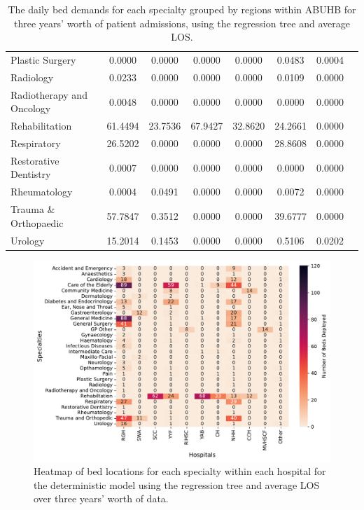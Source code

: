 \documentclass[thesis.tex]{subfiles}
\begin{document}
\begin{table}[h!]
{\begin{tabular}{lccccccc}
Plastic Surgery	&0.0000&	0.0000&	0.0000&	0.0000&	0.0483&	0.0004\\
Radiology	&0.0233&	0.0000&	0.0000&	0.0000&	0.0109&	0.0000\\
Radiotherapy and Oncology&	0.0048&	0.0000&	0.0000&	0.0000&	0.0000&	0.0000\\
Rehabilitation	&61.4494&	23.7536&	67.9427&	32.8620&	24.2661&	0.0000\\
Respiratory	&26.5202&	0.0000&	0.0000&	0.0000&	28.8608&	0.0000\\
Restorative Dentistry	&0.0007&	0.0000&	0.0000&	0.0000&	0.0000&	0.0000\\
Rheumatology	&0.0004&	0.0491&	0.0000&	0.0000&	0.0072&	0.0000\\
Trauma \& Orthopaedic&	57.7847&	0.3512&	0.0000&	0.0000&	39.6777&	0.0000\\
Urology	&15.2014&	0.1453&	0.0000&	0.0000&	0.5106&	0.0202\\                              \bottomrule
    \end{tabular}}
    \caption{The daily bed demands for each specialty grouped by regions within ABUHB for three years’ worth of patient admissions, using the regression tree and average LOS.}
    \label{apptab:LinkedDemands1}
\end{table}
\begin{figure}
    \centering
    \includegraphics[scale=0.55]{Figures - Heatmaps/Fig1.pdf}
    \caption{Heatmap of bed locations for each specialty within each hospital for the deterministic model using the regression tree and average LOS over three years' worth of data.}
    \label{fig:app1}
\end{figure}
\end{document}
